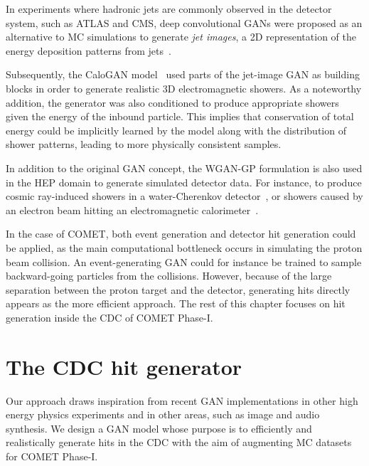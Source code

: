 In experiments where hadronic jets are commonly observed in the detector system, such as ATLAS and CMS, deep convolutional GANs were proposed as an alternative to MC simulations to generate \emph{jet images}, a 2D representation of the energy deposition patterns from jets~\cite{deOliveira2017b}. 

Subsequently, the {\sc CaloGAN} model~\cite{paganini_calogan_2018} used parts of the jet-image GAN as building blocks in order to generate realistic 3D electromagnetic showers. As a noteworthy addition, the generator was also conditioned to produce appropriate showers given the energy of the inbound particle. This implies that conservation of total energy could be implicitly learned by the model along with the distribution of shower patterns, leading to more physically consistent samples.


In addition to the original GAN concept, the WGAN-GP formulation is also used in the HEP domain to generate simulated detector data. For instance, to produce cosmic ray-induced showers in a water-Cherenkov detector~\cite{Erdmann2018}, or showers caused by an electron beam hitting an electromagnetic calorimeter~\cite{Erdmann2019}.

In the case of COMET, both event generation and detector hit generation could be applied, as the main computational bottleneck occurs in simulating the proton beam collision. An event-generating GAN could for instance be trained to sample backward-going particles from the collisions. However, because of the large separation between the proton target and the detector, generating hits directly appears as the more efficient approach.
The rest of this chapter focuses on hit generation inside the CDC of COMET Phase-I.





\section{The CDC hit generator}
Our approach draws inspiration from recent GAN implementations in other high energy physics experiments and in other areas, such as image and audio synthesis. We design a GAN model whose purpose is to efficiently and realistically generate hits in the CDC with the aim of augmenting MC datasets for COMET Phase-I. 

